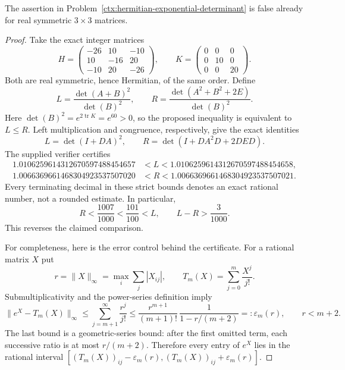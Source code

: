 \begin{cxrefutation}
\begin{theorem}\label{thm:hermitian-exponential-determinant}
The assertion in Problem~\ref{ctx:hermitian-exponential-determinant} is false
already for real symmetric $3\times3$ matrices.
\end{theorem}
\begin{proof}
Take the exact integer matrices
\[
 H=\begin{pmatrix}
 -26&10&-10\\
 10&-16&20\\
 -10&20&-26
 \end{pmatrix},
 \qquad
 K=\begin{pmatrix}
 0&0&0\\
 0&10&0\\
 0&0&20
 \end{pmatrix}.
\]
Both are real symmetric, hence Hermitian, of the same order. Define
\[
 L=\frac{\det(A+B)^2}{\det(B)^2},\qquad
 R=\frac{\det(A^2+B^2+2E)}{\det(B)^2}.
\]
Here $\det(B)^2=e^{2\operatorname{tr}K}=e^{60}>0$, so the proposed
inequality is equivalent to $L\leq R$. Left multiplication and congruence,
respectively, give the exact identities
\[
 L=\det(I+DA)^2,\qquad
 R=\det(I+DA^2D+2DED).
\]
The supplied verifier certifies
\begin{align*}
 1.0106259614312670597488454657
 &<L<1.0106259614312670597488454658,\\
 1.0066369661468304923537507020
 &<R<1.0066369661468304923537507021.
\end{align*}
Every terminating decimal in these strict bounds denotes an exact rational
number, not a rounded estimate. In particular,
\[
 R<\frac{1007}{1000}<\frac{101}{100}<L,
 \qquad L-R>\frac{3}{1000}.
\]
This reverses the claimed comparison.

For completeness, here is the error control behind the certificate.
For a rational matrix $X$ put
\[
 r=\|X\|_\infty=\max_i\sum_j|X_{ij}|,
 \qquad T_m(X)=\sum_{j=0}^{m}\frac{X^j}{j!}.
\]
Submultiplicativity and the power-series definition imply
\[
 \|e^X-T_m(X)\|_\infty
 \leq\sum_{j=m+1}^{\infty}\frac{r^j}{j!}
 \leq\frac{r^{m+1}}{(m+1)!}\,
       \frac{1}{1-r/(m+2)}
 =:\varepsilon_m(r),\qquad r<m+2.
\]
The last bound is a geometric-series bound: after the first omitted term,
each successive ratio is at most $r/(m+2)$. Therefore every entry of $e^X$
lies in the rational interval
$[(T_m(X))_{ij}-\varepsilon_m(r),
  (T_m(X))_{ij}+\varepsilon_m(r)]$.


\end{proof}
\end{cxrefutation}
